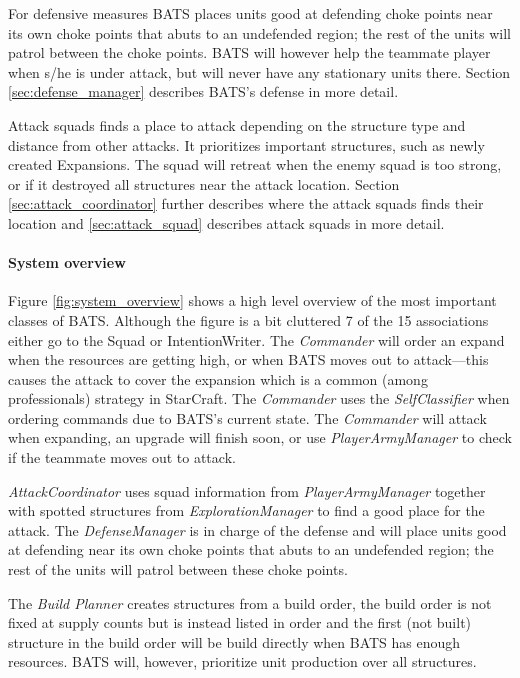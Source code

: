 For defensive measures BATS places units good at defending choke points near its own choke points
that abuts to an undefended region; the rest of the units will patrol between the choke points. BATS
will however help the teammate player when s/he is under attack, but will never have any stationary
units there. Section \ref{sec:defense_manager}  describes BATS's
defense in more detail.

Attack squads finds a place to attack depending on the structure type and distance from other
attacks. It prioritizes important structures, such as newly created Expansions. The squad will
retreat when the enemy squad is too strong, or if it destroyed all structures near the attack
location. Section \ref{sec:attack_coordinator}  further describes
where the attack squads finds their location and \ref{sec:attack_squad} 
describes attack squads in more detail.

\paragraph{System overview}
Figure \ref{fig:system_overview} shows a high level overview of the most important classes of BATS. Although the figure is a bit cluttered 7 of the 15 associations either go to the Squad or IntentionWriter. The \emph{Commander} will order an expand when the resources are getting high, or when BATS moves out to attack—this causes the attack to cover the expansion which is a common (among professionals) strategy in StarCraft\cite{day9}. The \emph{Commander} uses the \emph{SelfClassifier} when ordering commands due to BATS's current state. The \emph{Commander} will attack when expanding, an upgrade will finish soon, or use \emph{PlayerArmyManager} to check if the teammate moves out to attack.

\emph{AttackCoordinator} uses squad information from \emph{PlayerArmyManager} together with spotted structures from \emph{ExplorationManager} to find a good place for the attack. The \emph{DefenseManager} is in charge of the defense and will place units good at defending near its own choke points that abuts to an undefended region; the rest of the units will patrol between these choke points.

The \emph{Build Planner} creates structures from a build order, the build order is not fixed at supply counts but is instead listed in order and the first (not built) structure in the build order will be build directly when BATS has enough resources. BATS will, however, prioritize unit production over all structures.

